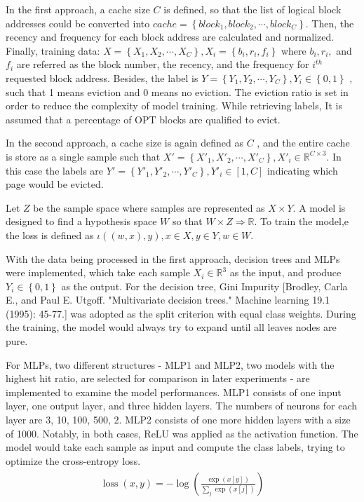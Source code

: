 \documentclass[letterpaper,twocolumn,10pt]{article}
\begin{document}
In the first approach, a cache size $C$ is defined, so that the list of logical block addresses could be converted into $cache = \left \{ block_1, block_2,\cdots , block_C \right \}$. Then, the recency and frequency for each block address are calculated and normalized. Finally, training data: $X = \left \{ X_1, X_2, \cdots, X_C \right \}, X_i = \left \{ b_i, r_i, f_i \right \}$ where $b_i, r_i,$ and $f_i$ are referred as the block number, the recency, and the frequency for $i^{th}$ requested block address. Besides, the label is $Y = \left \{Y_1, Y_2, \cdots, Y_C\right\}, Y_i \in \left \{ 0,1 \right \}$ , such that 1 means eviction and 0 means no eviction. The eviction ratio is set in order to reduce the complexity of model training. While retrieving labels, It is assumed that a percentage of OPT blocks are qualified to evict.

In the second approach, a cache size is again defined as $C$ , and the entire cache is store as a single sample such that ${X}' = \left \{ {{X}'}_1, {{X}'}_2, \cdots, {{X}'}_C \right \}, {{X}'}_i \in \mathbb{R}^{C\times 3}$. In this case the labels are ${Y}' = \left \{{Y}'_1, {Y}'_2, \cdots, {Y}'_C\right\}, {Y}'_i \in [1,C]$ indicating which page would be evicted.

Let $Z$ be the sample space where samples are represented as $X\times Y$. A model is designed to find a hypothesis space $W$ so that $W\times Z \Rightarrow \mathbb{R}$. To train the model,e the loss is defined as $\iota\left ( (w,x),y \right ), x\in X, y \in Y, w \in W$.

With the data being processed in the first approach, decision trees and MLPs were implemented, which take each sample $X_i \in \mathbb{R}^{3}$ as the input, and produce $Y_i \in \left\{0,1\right\}$ as the output. For the decision tree, Gini Impurity [Brodley, Carla E., and Paul E. Utgoff. "Multivariate decision trees." Machine learning 19.1 (1995): 45-77.] was adopted as the split criterion with equal class weights. During the training, the model would always try to expand until all leaves nodes are pure. 


For MLPs, two different structures - MLP1 and MLP2, two models with the highest hit ratio, are selected for comparison in later experiments - are implemented to examine the model performances. MLP1 consists of one input layer, one output layer, and three hidden layers. The numbers of neurons for each layer are 3, 10, 100, 500, 2. MLP2 consists of one more hidden layers with a size of 1000. Notably, in both cases, ReLU was applied as the activation function. The model would take each sample as input and compute the class labels, trying to optimize the cross-entropy loss.
\begin{align} 
\begin{split}
\operatorname{loss}(x, y)=-\log \left(\frac{\exp (x[y])}{\sum_{j} \exp (x[j])}\right)
\end{split}         
\end{align}
\end{document}
